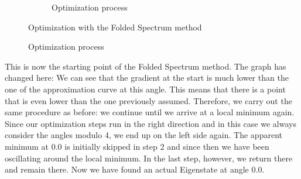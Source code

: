 \documentclass[
  letterpaper,
  DIV=11,
  numbers=noendperiod]{scrartcl}
\begin{document}
\begin{figure}
\begin{minipage}{0.50\linewidth}
\begin{figure}[H]
{}

\caption{\label{fig-hanno}Optimization process}

\end{figure}%

\end{minipage}%
\newline
\begin{minipage}{0.50\linewidth}
Optimization with the Folded Spectrum method\end{minipage}%

\end{figure}%

This is now the starting point of the Folded Spectrum method. The graph
has changed here: We can see that the gradient at the start is much
lower than the one of the approximation curve at this angle. This means
that there is a point that is even lower than the one previously
assumed. Therefore, we carry out the same procedure as before: we
continue until we arrive at a local minimum again. Since our
optimization steps run in the right direction and in this case we always
consider the angles modulo 4, we end up on the left side again. The
apparent minimum at 0.0 is initially skipped in step 2 and since then we
have been oscillating around the local minimum. In the last step,
however, we return there and remain there. Now we have found an actual
Eigenstate at angle 0.0.
\end{document}
